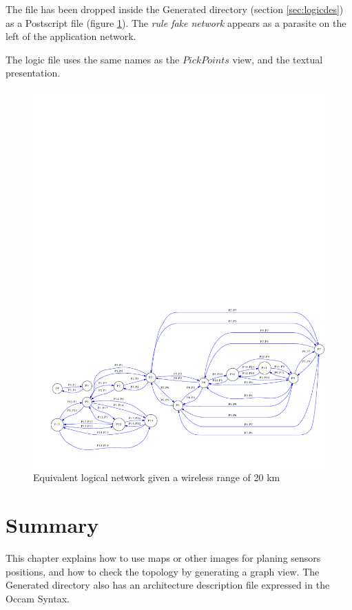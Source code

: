 \documentclass[times]{book}
\begin{document}
The file has been dropped inside the Generated directory (section \ref{sec:logicdes})
as a Postscript file (figure \ref{fig:mekong1Logic}).
The {\sl rule fake network} appears as a parasite on the left
of the application network.

The logic file uses the same names as the $Pick Points$ view, and the textual presentation.

\begin{figure}[hbtp]
\begin{center} 
\includegraphics[width=12cm]{mekong1Logic.pdf}
\caption{Equivalent  logical network given a wireless range of 20 km
}
\label{fig:mekong1Logic}
\end{center}
\end{figure}



\section{Summary}

This chapter explains how to use maps or other images for planing sensors
positions, and how to check the topology by generating a graph view.
The Generated directory also has an architecture description file 
expressed in the Occam Syntax.
\end{document}
